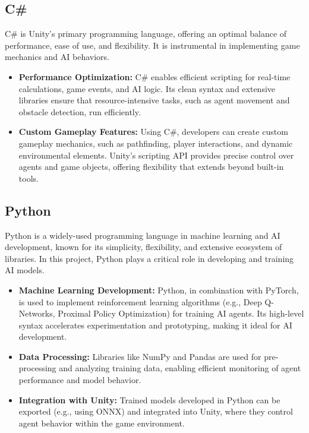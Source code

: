 \documentclass[12pt,oneside,openright,a4paper]{cpe-english-project}
\begin{document}
\subsection{C\#}
C\# is Unity's primary programming language, offering an optimal balance of performance, ease of use, and flexibility. It is instrumental in implementing game mechanics and AI behaviors.
\begin{itemize}
\item  \textbf{Performance Optimization:} C\# enables efficient scripting for real-time calculations, game events, and AI logic. Its clean syntax and extensive libraries ensure that resource-intensive tasks, such as agent movement and obstacle detection, run efficiently.
\item  \textbf{Custom Gameplay Features:} Using C\#, developers can create custom gameplay mechanics, such as pathfinding, player interactions, and dynamic environmental elements. Unity's scripting API provides precise control over agents and game objects, offering flexibility that extends beyond built-in tools.
\end{itemize}

\subsection{Python}
Python is a widely-used programming language in machine learning and AI development, known for its simplicity, flexibility, and extensive ecosystem of libraries. In this project, Python plays a critical role in developing and training AI models.
\begin{itemize}
\item  \textbf{Machine Learning Development:} Python, in combination with PyTorch, is used to implement reinforcement learning algorithms (e.g., Deep Q-Networks, Proximal Policy Optimization) for training AI agents. Its high-level syntax accelerates experimentation and prototyping, making it ideal for AI development.
\item  \textbf{Data Processing:} Libraries like NumPy and Pandas are used for pre-processing and analyzing training data, enabling efficient monitoring of agent performance and model behavior.
\item  \textbf{Integration with Unity:} 
Trained models developed in Python can be exported (e.g., using ONNX) and integrated into Unity, where they control agent behavior within the game environment.
\end{itemize}
\end{document}
